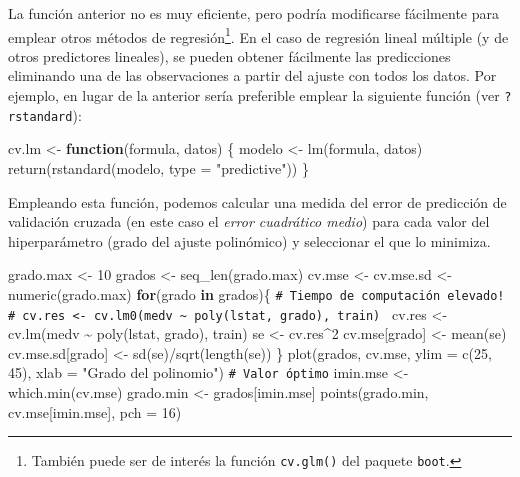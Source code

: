 \documentclass[
]{book}
\newenvironment{Shaded}{\begin{snugshade}}{\end{snugshade}}
\newcommand{\AttributeTok}[1]{\textcolor[rgb]{0.77,0.63,0.00}{#1}}
\newcommand{\CommentTok}[1]{\textcolor[rgb]{0.56,0.35,0.01}{\textit{#1}}}
\newcommand{\ControlFlowTok}[1]{\textcolor[rgb]{0.13,0.29,0.53}{\textbf{#1}}}
\newcommand{\DecValTok}[1]{\textcolor[rgb]{0.00,0.00,0.81}{#1}}
\newcommand{\FunctionTok}[1]{\textcolor[rgb]{0.00,0.00,0.00}{#1}}
\newcommand{\NormalTok}[1]{#1}
\newcommand{\OtherTok}[1]{\textcolor[rgb]{0.56,0.35,0.01}{#1}}
\newcommand{\SpecialCharTok}[1]{\textcolor[rgb]{0.00,0.00,0.00}{#1}}
\newcommand{\StringTok}[1]{\textcolor[rgb]{0.31,0.60,0.02}{#1}}
\theoremstyle{break}
\theoremstyle{nonumberplain}
\renewcommand{\CommentTok}[1]{\textcolor[rgb]{0.41,0.41,0.41}{\texttt{#1}}}
\begin{document}
La función anterior no es muy eficiente, pero podría modificarse fácilmente para emplear otros métodos de regresión\footnote{También puede ser de interés la función \texttt{cv.glm()} del paquete \texttt{boot}.}.
En el caso de regresión lineal múltiple (y de otros predictores lineales), se pueden obtener fácilmente las predicciones eliminando una de las observaciones a partir del ajuste con todos los datos.
Por ejemplo, en lugar de la anterior sería preferible emplear la siguiente función (ver \texttt{?rstandard}):

\begin{Shaded}
\begin{Highlighting}[]
\NormalTok{cv.lm }\OtherTok{\textless{}{-}} \ControlFlowTok{function}\NormalTok{(formula, datos) \{}
\NormalTok{    modelo }\OtherTok{\textless{}{-}} \FunctionTok{lm}\NormalTok{(formula, datos)}
    \FunctionTok{return}\NormalTok{(}\FunctionTok{rstandard}\NormalTok{(modelo, }\AttributeTok{type =} \StringTok{"predictive"}\NormalTok{))}
\NormalTok{\}}
\end{Highlighting}
\end{Shaded}

Empleando esta función, podemos calcular una medida del error de predicción de validación cruzada (en este caso el \emph{error cuadrático medio}) para cada valor del hiperparámetro (grado del ajuste polinómico) y seleccionar el que lo minimiza.

\begin{Shaded}
\begin{Highlighting}[]
\NormalTok{grado.max }\OtherTok{\textless{}{-}} \DecValTok{10}
\NormalTok{grados }\OtherTok{\textless{}{-}} \FunctionTok{seq\_len}\NormalTok{(grado.max) }
\NormalTok{cv.mse }\OtherTok{\textless{}{-}}\NormalTok{ cv.mse.sd }\OtherTok{\textless{}{-}} \FunctionTok{numeric}\NormalTok{(grado.max)}
\ControlFlowTok{for}\NormalTok{(grado }\ControlFlowTok{in}\NormalTok{ grados)\{}
  \CommentTok{\# Tiempo de computación elevado!}
  \CommentTok{\# cv.res \textless{}{-} cv.lm0(medv \textasciitilde{} poly(lstat, grado), train) }
\NormalTok{  cv.res }\OtherTok{\textless{}{-}} \FunctionTok{cv.lm}\NormalTok{(medv }\SpecialCharTok{\textasciitilde{}} \FunctionTok{poly}\NormalTok{(lstat, grado), train)}
\NormalTok{  se }\OtherTok{\textless{}{-}}\NormalTok{ cv.res}\SpecialCharTok{\^{}}\DecValTok{2}
\NormalTok{  cv.mse[grado] }\OtherTok{\textless{}{-}} \FunctionTok{mean}\NormalTok{(se)}
\NormalTok{  cv.mse.sd[grado] }\OtherTok{\textless{}{-}} \FunctionTok{sd}\NormalTok{(se)}\SpecialCharTok{/}\FunctionTok{sqrt}\NormalTok{(}\FunctionTok{length}\NormalTok{(se))}
\NormalTok{\}}
\FunctionTok{plot}\NormalTok{(grados, cv.mse, }\AttributeTok{ylim =} \FunctionTok{c}\NormalTok{(}\DecValTok{25}\NormalTok{, }\DecValTok{45}\NormalTok{),}
  \AttributeTok{xlab =} \StringTok{"Grado del polinomio"}\NormalTok{)}
\CommentTok{\# Valor óptimo}
\NormalTok{imin.mse }\OtherTok{\textless{}{-}} \FunctionTok{which.min}\NormalTok{(cv.mse)}
\NormalTok{grado.min }\OtherTok{\textless{}{-}}\NormalTok{ grados[imin.mse]}
\FunctionTok{points}\NormalTok{(grado.min, cv.mse[imin.mse], }\AttributeTok{pch =} \DecValTok{16}\NormalTok{)}
\end{Highlighting}
\end{Shaded}
\end{document}
